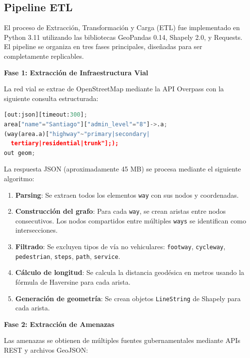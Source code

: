 \documentclass[conference]{IEEEtran}
\begin{document}
\subsection{Pipeline ETL}

El proceso de Extracción, Transformación y Carga (ETL) fue implementado en Python 3.11 utilizando las bibliotecas GeoPandas 0.14, Shapely 2.0, y Requests. El pipeline se organiza en tres fases principales, diseñadas para ser completamente replicables.

\textbf{Fase 1: Extracción de Infraestructura Vial}

La red vial se extrae de OpenStreetMap mediante la API Overpass con la siguiente consulta estructurada:

\begin{lstlisting}[language=Python, basicstyle=\tiny\ttfamily]
[out:json][timeout:300];
area["name"="Santiago"]["admin_level"="8"]->.a;
(way(area.a)["highway"~"primary|secondary|
  tertiary|residential|trunk"];);
out geom;
\end{lstlisting}

La respuesta JSON (aproximadamente 45 MB) se procesa mediante el siguiente algoritmo:

\begin{enumerate}
    \item \textbf{Parsing}: Se extraen todos los elementos \texttt{way} con sus nodos y coordenadas.
    \item \textbf{Construcción del grafo}: Para cada \texttt{way}, se crean aristas entre nodos consecutivos. Los nodos compartidos entre múltiples \texttt{ways} se identifican como intersecciones.
    \item \textbf{Filtrado}: Se excluyen tipos de vía no vehiculares: \texttt{footway}, \texttt{cycleway}, \texttt{pedestrian}, \texttt{steps}, \texttt{path}, \texttt{service}.
    \item \textbf{Cálculo de longitud}: Se calcula la distancia geodésica en metros usando la fórmula de Haversine para cada arista.
    \item \textbf{Generación de geometría}: Se crean objetos \texttt{LineString} de Shapely para cada arista.
\end{enumerate}

\textbf{Fase 2: Extracción de Amenazas}

Las amenazas se obtienen de múltiples fuentes gubernamentales mediante APIs REST y archivos GeoJSON:
\end{document}
